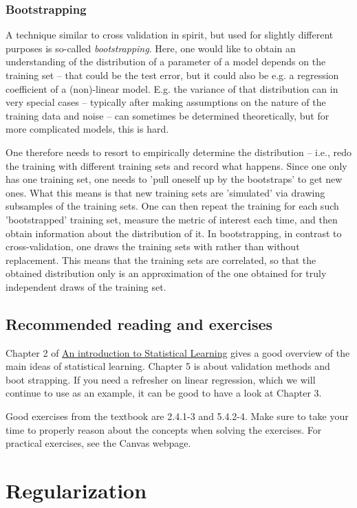 \documentclass{article}
\begin{document}
\subsubsection{Bootstrapping} A technique similar to cross validation in spirit, but used for slightly different purposes is so-called \emph{bootstrapping}. Here, one would like to obtain an understanding of the distribution of a parameter of a model depends on the training set -- that could be the test error, but it could also be e.g. a regression coefficient of a (non)-linear model. E.g. the variance of that distribution can in very special cases -- typically after making assumptions on the nature of the training data and noise -- can sometimes be determined theoretically, but for more complicated models, this is hard. 

One therefore needs to resort to empirically determine the distribution -- i.e., redo the training with different training sets and record what happens. Since one only has one training set, one needs to 'pull oneself up by the bootstraps' to get new ones. What this means is that new training sets are 'simulated' via drawing subsamples of the training sets. One can then repeat the training for each such 'bootstrapped' training set, measure the metric of interest each time, and then obtain information about the distribution of it. In bootstrapping, in contrast to cross-validation, one draws the training sets with rather than without replacement. This means that the training sets are correlated, so that the obtained distribution only is an approximation of the one obtained for truly independent draws of the training set.

\subsection{Recommended reading and exercises}
Chapter 2 of \href{https://www.statlearning.com/}{An introduction to Statistical Learning} gives a good overview of the main ideas of statistical learning. Chapter 5 is about validation methods and boot strapping. If you need a refresher on linear regression, which we will continue to use as an example, it can be good to have a look at Chapter 3.

Good exercises from the textbook are 2.4.1-3 and 5.4.2-4. Make sure to take your time to properly reason about the concepts when solving the exercises. For practical exercises, see the Canvas webpage.


\section{Regularization}
\end{document}
